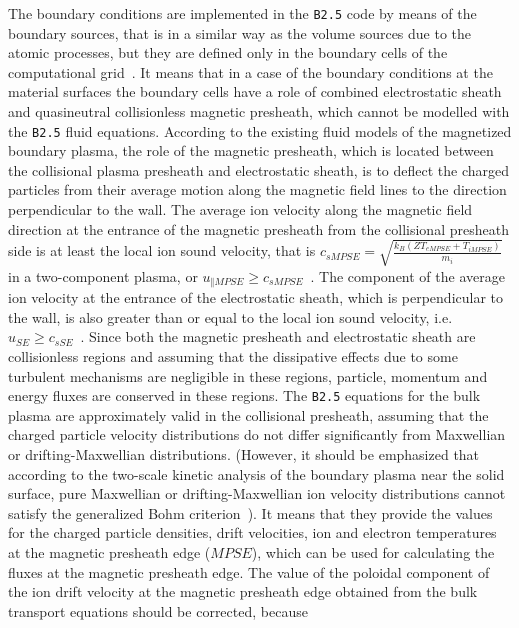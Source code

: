\documentclass[a4paper,10pt]{report}
\begin{document}
The boundary conditions are implemented in the {\tt B2.5} code by means of the
boundary sources, that is in a similar way as the volume sources due to the
atomic processes, but they are defined only in the boundary cells of the
computational grid~\cite{BAELMANS94A}. It means that in a case of the
boundary conditions at the material surfaces the boundary cells have a role
of combined electrostatic sheath and quasineutral collisionless magnetic
presheath, which cannot be modelled with the {\tt B2.5} fluid equations. According
to the existing fluid models of the magnetized boundary plasma, the role of
the magnetic presheath, which is located between the collisional plasma
presheath and electrostatic sheath, is to deflect the charged particles from
their average motion along the magnetic field lines to the direction
perpendicular to the wall. The average ion velocity along the magnetic field
direction at the entrance of the magnetic presheath from the collisional
presheath side is at least the local ion sound velocity, that is
$c_{sMPSE}=\sqrt{\frac {k_{B}(ZT_{eMPSE}+T_{iMPSE})}{m_{i}}}$ in a two-component
plasma, or $u_{\Vert MPSE} \geq c_{sMPSE}$~\cite{STANGEBY95A}. The component of
the average ion velocity at the entrance of the electrostatic sheath, which
is perpendicular to the wall, is also greater than or equal to the local ion
sound velocity, i.e. $u_{SE} \geq c_{sSE}$~\cite{Riemann1991a,STANGEBY95A}.
Since both the magnetic presheath and electrostatic sheath are
collisionless regions and assuming that the dissipative effects due to some
turbulent mechanisms are negligible in these regions, particle, momentum and
energy fluxes are conserved in these regions. The {\tt B2.5} equations for the
bulk plasma are approximately valid in the collisional presheath, assuming
that the charged particle velocity distributions do not differ significantly
from Maxwellian or drifting-Maxwellian distributions. (However, it should be
emphasized that according to the two-scale kinetic analysis of the boundary
plasma near the solid surface, pure Maxwellian or drifting-Maxwellian ion
velocity distributions cannot satisfy the generalized Bohm
criterion~\cite{Riemann1991a,Riemann1997,Daube1999}). It means that they provide
the values for the charged particle densities, drift velocities, ion and
electron temperatures at the magnetic presheath edge ($MPSE$), which can be
used for calculating the fluxes at the magnetic presheath edge. The value of
the poloidal component of the ion drift velocity at the magnetic presheath
edge obtained from the bulk transport equations should be corrected, because
\end{document}
